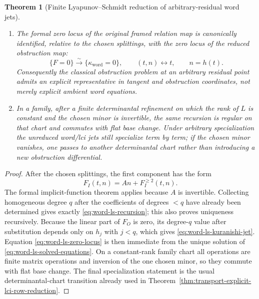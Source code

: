 \documentclass[11pt]{article}
\newtheorem{theorem}{Theorem}[section]
\theoremstyle{definition}
\begin{document}
\begin{theorem}[Finite Lyapunov--Schmidt reduction of arbitrary-residual word jets]
\begin{enumerate}[label=\textnormal{(\roman*)}]
\item The formal zero locus of the original framed relation map is
canonically identified, relative to the chosen splittings, with the zero
locus of the reduced obstruction map:
\begin{equation}\label{eq:word-ls-zero-locus}
 \{F=0\}
 \xrightarrow{\sim}
 \{\kappa_{\mathrm{word}}=0\},
 \qquad
 (t,n)\longleftrightarrow t,
 \qquad n=h(t).
\end{equation}
Consequently the classical obstruction problem at an arbitrary residual
point admits an explicit representative in tangent and obstruction
coordinates, not merely explicit ambient word equations.

\item In a family, after a finite determinantal refinement on which the rank
of $L$ is constant and the chosen minor is invertible, the same recursion is
regular on that chart and commutes with flat base change.  Under arbitrary
specialization the unreduced word/lci jets still specialize term by term; if
the chosen minor vanishes, one passes to another determinantal chart rather
than introducing a new obstruction differential.
\end{enumerate}
\end{theorem}

\begin{proof}
After the chosen splittings, the first component has the form
\[
 F_I(t,n)=An+F_I^{\ge2}(t,n).
\]
The formal implicit-function theorem applies because $A$ is invertible.
Collecting homogeneous degree $q$ after the coefficients of degrees $<q$
have already been determined gives exactly
\eqref{eq:word-ls-recursion}; this also proves uniqueness recursively.
Because the linear part of $F_O$ is zero, its degree-$q$ value after
substitution depends only on $h_j$ with $j<q$, which gives
\eqref{eq:word-ls-kuranishi-jet}.  Equation
\eqref{eq:word-ls-zero-locus} is then immediate from the unique solution of
\eqref{eq:word-ls-solved-equations}.  On a constant-rank family chart all
operations are finite matrix operations and inversion of the one chosen
minor, so they commute with flat base change.  The final specialization
statement is the usual determinantal-chart transition already used in
Theorem~\ref{thm:transport-explicit-lci-row-reduction}.
\end{proof}
\end{document}

